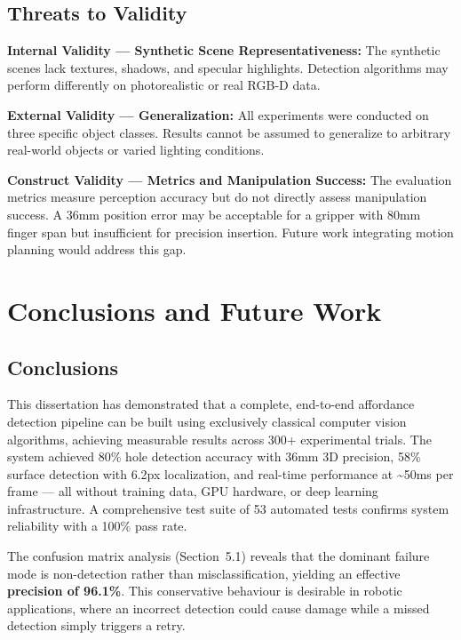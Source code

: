 \documentclass[11pt,a4paper]{article}
\begin{document}
\subsection{Threats to Validity}

\textbf{Internal Validity --- Synthetic Scene Representativeness:} The synthetic scenes lack textures, shadows, and specular highlights. Detection algorithms may perform differently on photorealistic or real RGB-D data.

\textbf{External Validity --- Generalization:} All experiments were conducted on three specific object classes. Results cannot be assumed to generalize to arbitrary real-world objects or varied lighting conditions.

\textbf{Construct Validity --- Metrics and Manipulation Success:} The evaluation metrics measure perception accuracy but do not directly assess manipulation success. A 36mm position error may be acceptable for a gripper with 80mm finger span but insufficient for precision insertion. Future work integrating motion planning would address this gap.

\section{Conclusions and Future Work}

\subsection{Conclusions}

This dissertation has demonstrated that a complete, end-to-end affordance detection pipeline can be built using exclusively classical computer vision algorithms, achieving measurable results across 300+ experimental trials. The system achieved 80\% hole detection accuracy with 36mm 3D precision, 58\% surface detection with 6.2px localization, and real-time performance at \textasciitilde50ms per frame --- all without training data, GPU hardware, or deep learning infrastructure. A comprehensive test suite of 53 automated tests confirms system reliability with a 100\% pass rate.

The confusion matrix analysis (Section~5.1) reveals that the dominant failure mode is non-detection rather than misclassification, yielding an effective \textbf{precision of 96.1\%}. This conservative behaviour is desirable in robotic applications, where an incorrect detection could cause damage while a missed detection simply triggers a retry.
\end{document}
